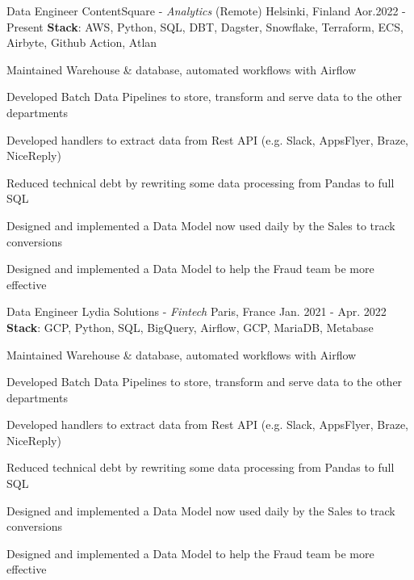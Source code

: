 

\begin{cventries}

\cventry
{Data Engineer} %
{ContentSquare - \emph{Analytics}} %
{(Remote) Helsinki, Finland} %
{Aor.2022 - Present} %
{\textbf{Stack}: AWS, Python, SQL, DBT, Dagster, Snowflake, Terraform, ECS, Airbyte, Github Action, Atlan} %
{
  \begin{cvitems} %
    \item {Maintained Warehouse \& database,  automated workflows with Airflow}
    \item {Developed Batch Data Pipelines to store, transform and serve data to the other departments}
    \item {Developed handlers to extract data from Rest API (e.g. Slack, AppsFlyer, Braze, NiceReply)}
    \item {Reduced technical debt by rewriting some data processing from Pandas to full SQL}
    \item {Designed and implemented a Data Model now used daily by the Sales to track conversions}
    \item {Designed and implemented a Data Model to help the Fraud team be more effective}
  \end{cvitems}
}

\cventry
{Data Engineer} %
{Lydia Solutions - \emph{Fintech}} %
{Paris, France} %
{Jan. 2021 - Apr. 2022} %
{\textbf{Stack}: GCP, Python, SQL, BigQuery, Airflow, GCP, MariaDB, Metabase} %
{
  \begin{cvitems} %
    \item {Maintained Warehouse \& database,  automated workflows with Airflow}
    \item {Developed Batch Data Pipelines to store, transform and serve data to the other departments}
    \item {Developed handlers to extract data from Rest API (e.g. Slack, AppsFlyer, Braze, NiceReply)}
    \item {Reduced technical debt by rewriting some data processing from Pandas to full SQL}
    \item {Designed and implemented a Data Model now used daily by the Sales to track conversions}
    \item {Designed and implemented a Data Model to help the Fraud team be more effective}
  \end{cvitems}
}


\end{cventries}
